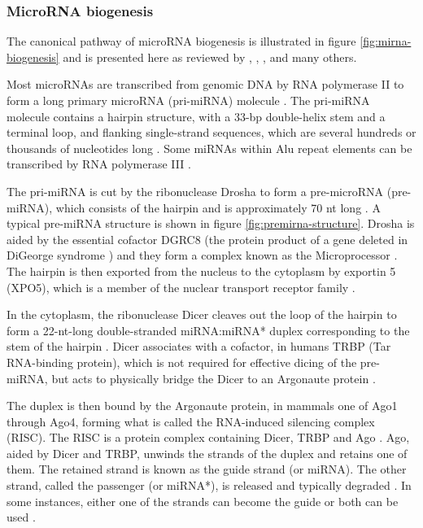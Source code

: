 





\subsubsection{MicroRNA biogenesis}\label{microrna-biogenesis}

The canonical pathway of microRNA biogenesis is illustrated in figure
\ref{fig:mirna-biogenesis} and is presented here as reviewed by \citet{Bartel2004},
\citet{Melo2011}, \citet{Ha2014}, and many others. 

Most microRNAs are transcribed from genomic DNA by RNA polymerase II to form a
long primary microRNA (pri-miRNA) molecule \citep{Lee2004}. The pri-miRNA molecule
contains a hairpin structure, with a 33-bp double-helix stem and a terminal
loop, and flanking single-strand sequences, which are several hundreds or
thousands of nucleotides long \citep{Kim2005}. Some miRNAs within Alu repeat elements
can be transcribed by RNA polymerase III \citep{Borchert2006}.

The pri-miRNA is cut by the ribonuclease Drosha to form %
a pre-microRNA (pre-miRNA), which consists of the hairpin and is
approximately 70 nt long \citep{Lee2003}. A typical pre-miRNA structure is
shown in figure \ref{fig:premirna-structure}. Drosha is aided by the essential
cofactor DGRC8 (the protein product of a gene deleted in DiGeorge syndrome \citep{Shiohama2003})
and they form a complex known as the Microprocessor \citep{Gregory2004}.
The hairpin is
then exported from the nucleus to the cytoplasm by exportin 5 (XPO5), which is
a member of the nuclear transport receptor family \citep{Lund2004}.

In the cytoplasm, the ribonuclease Dicer cleaves out the loop of the hairpin
to form a 22-nt-long double-stranded miRNA:miRNA* duplex corresponding to
the stem of the hairpin \citep{Bernstein2001}.
Dicer associates with a cofactor, in humans TRBP (Tar RNA-binding protein),
which is not required for effective dicing of the pre-miRNA,
but acts to physically bridge the Dicer to an Argonaute protein
\citep{Chendrimada2005}.

The duplex is then bound by the Argonaute protein, in mammals one of Ago1
through Ago4, forming what is called the RNA-induced silencing complex (RISC).
The RISC is a protein complex containing Dicer, TRBP and Ago \citep{Gregory2005}.
Ago, aided by Dicer and TRBP, unwinds the strands of the duplex and retains one of
them. The retained strand is known as the guide strand (or miRNA). The other
strand, called the passenger (or miRNA*), is released and typically degraded \citep{Du2005}.
In some instances, either one of the strands can become the guide
or both can be used \citep{Czech2009}.

